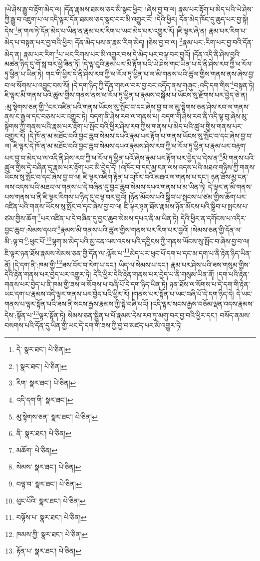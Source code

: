 །ཡེ་ཤེས་རྒྱུ་བ་རྟོག་མེད་ལ། །དོན་རྣམས་ཐམས་ཅད་མི་སྣང་ཕྱིར། །ཞེས་བྱ་བ་ལ། རྣམ་པར་རྟོག་པ་མེད་པའི་ཡེ་ཤེས་ཀྱི་རྒྱུ་བ་འཇུག་པ་ལ་འདི་ལྟར་དོན་ཐམས་ཅད་སྣང་བར་མི་འགྱུར་རོ། །དེའི་ཕྱིར། དོན་མེད་ཁོང་དུ་ཆུད་པར་བྱ་སྟེ། དེས་\footnote{དེ་  སྣར་ཐང་།  པེ་ཅིན། }ན་གལ་ཏེ་དོན་མེད་པ་ཡིན་ན་རྣམ་པར་རིག་པ་ཡང་མེད་པར་འགྱུར་རོ། །ཇི་ལྟར་ཞེ་ན། རྣམ་པར་རིག་པ་མེད་པ་བསྟན་པར་བྱ་བའི་ཕྱིར། དོན་མེད་པས་ན་རྣམ་རིག་མེད། །ཅེས་བྱ་བ་ལ། \footnote{།    སྣར་ཐང་།  པེ་ཅིན། }རྣམ་པར་:རིག་པར་བྱ་བའི་དོན་མེད་ན། རྣམ་པར་རིག་\footnote{རིག་  སྣར་ཐང་།  པེ་ཅིན། }པ་ཡང་རིགས་པར་མི་འགྱུར་བས་དེ་མེད་པར་བལྟ་བར་བྱའོ། །དོན་འདི་ནི་ཤེས་བྱའི་མཚན་ཉིད་དུ་གོ་སླ་བར་ཕྱེ་ཟིན་ཏོ། །དེ་ལྟ་བུའི་རྣམ་པར་མི་རྟོག་པའི་ཡེ་ཤེས་གང་ཡིན་པ་དེ་ནི་ཤེས་རབ་ཀྱི་ཕ་རོལ་ཏུ་ཕྱིན་པ་ཡིན་ཏེ། གང་གི་ཕྱིར་དེ་ནི་ཤེས་རབ་ཀྱི་ཕ་རོལ་ཏུ་ཕྱིན་པ་ལ་མི་གནས་པའི་ཚུལ་གྱིས་གནས་ནས་ཞེས་བྱ་བ་ལ་སོགས་པ་འབྱུང་བས་སོ། །དེ་དག་ཉིད་ཀྱི་དོན་གསལ་བར་བྱ་བར་འདོད་ནས་གཞུང་:འདི་དག་གིས་\footnote{འདི་དག་གི་  སྣར་ཐང་། }བསྟན་ཏེ། ཇི་ལྟར་མི་གནས་པའི་ཚུལ་གྱིས་གནས་ནས་ཕ་རོལ་ཏུ་ཕྱིན་པ་རྣམས་བསྒོམ་པ་ཡོངས་སུ་རྫོགས་པར་བྱེད་ཅེ་ན། :མུ་སྟེགས་ཅན་གྱི་\footnote{མུ་སྟེགས་ཅན་  སྣར་ཐང་།  པེ་ཅིན། }ངར་འཛིན་པའི་གནས་ཡོངས་སུ་སྤོང་བ་དང་ཞེས་བྱ་བ་ལ་མུ་སྟེགས་ཅན་ཤེས་རབ་ལ་གནས་ནས་ང་རྒྱལ་དང་བཅས་པར་འགྱུར་ཏེ། བདག་ནི་ཤེས་རབ་ལ་གནས་པ། བདག་གི་ཤེས་རབ་ནི་འདི་ལྟ་བུ་ཞེས་མུ་སྟེགས་ཀྱི་གནས་པའི་རྣམ་པར་རྟོག་པ་སྤོང་བའི་ཕྱིར་ཤེས་རབ་ཀྱིས་གནས་པ་མེད་པའི་ཚུལ་གྱིས་གནས་པར་འགྱུར་རོ། །དེ་ཁོ་ན་མ་མཐོང་བའི་བྱང་ཆུབ་སེམས་དཔའི་རྣམ་པར་རྟོག་པ་གནས་ཡོངས་སུ་སྤོང་བ་དང་ཞེས་བྱ་བ་ལ། ཇི་ལྟར་དེ་ཁོ་ན་མ་མཐོང་བའི་བྱང་ཆུབ་སེམས་དཔའ་རྣམས་ཤེས་རབ་ཀྱི་ཕ་རོལ་ཏུ་ཕྱིན་པ་རྣམ་པར་བརྟག་པར་བྱ་བ་མེད་པ་ལ་འདི་ནི་ཤེས་རབ་ཀྱི་ཕ་རོལ་ཏུ་ཕྱིན་པའོ་ཞེས་རྣམ་པར་རྟོག་པར་བྱེད་པ་དེས་ན་\footnote{ནི་  སྣར་ཐང་།  པེ་ཅིན། }མི་གནས་པའི་ཚུལ་གྱིས་དེ་བཞིན་དུ་རྣམ་པར་རྟོག་པར་མི་བྱེད་དོ། །འཁོར་བ་དང་མྱ་ངན་ལས་འདས་པའི་མཐའ་གཉིས་ཀྱི་གནས་ཡོངས་སུ་སྤོང་བ་དང་ཞེས་བྱ་བ་ལ། ཇི་ལྟར་འཇིག་རྟེན་པ་འཁོར་བའི་མཐའ་ལ་གནས་པ་དང་། ཉན་ཐོས་མྱ་ངན་ལས་འདས་པའི་མཐའ་ལ་གནས་པ་དེ་བཞིན་དུ་བྱང་ཆུབ་སེམས་དཔའ་གནས་པ་མ་ཡིན་ཏེ། དེ་ལྟར་ན་མི་གནས་པས་གནས་པ་ནི་ཇི་ལྟར་རིགས་པ་ཉིད་དུ་བལྟ་བར་བྱའོ། །ཉོན་མོངས་པའི་སྒྲིབ་པ་སྤངས་པ་ཙམ་གྱིས་ཆོག་པར་འཛིན་པའི་གནས་ཡོངས་སུ་སྤོང་བ་དང་ཞེས་བྱ་བ་ལ། ཇི་ལྟར་ཉན་ཐོས་རྣམས་ཉོན་མོངས་པའི་སྒྲིབ་པ་སྤངས་པ་ཙམ་གྱིས་ཆོག་\footnote{མཆོག་  པེ་ཅིན། }པར་འཛིན་པ་དེ་བཞིན་དུ་བྱང་ཆུབ་སེམས་དཔའ་ནི་མ་ཡིན་ཏེ། དེའི་ཕྱིར་ན་དགོངས་པ་འདིར་བྱང་ཆུབ་:སེམས་དཔའ་\footnote{སེམས་  སྣར་ཐང་།  པེ་ཅིན། }རྣམས་མི་གནས་པའི་ཚུལ་གྱིས་གནས་པར་རིག་པར་བྱའོ། །སེམས་ཅན་གྱི་དོན་ལ་མི་:ལྟ་བ་\footnote{བལྟ་བ་  སྣར་ཐང་།  པེ་ཅིན། }:ཕུང་པོ་\footnote{ཕུང་པོའི་  སྣར་ཐང་།  པེ་ཅིན། }ལྷག་མ་མེད་པའི་མྱ་ངན་ལས་འདས་པའི་དབྱིངས་ཀྱི་གནས་ཡོངས་སུ་སྤོང་བ་ཞེས་བྱ་བ་ལ། ཇི་ལྟར་ཉན་ཐོས་རྣམས་སེམས་ཅན་གྱི་དོན་ལ་:ལྟོས་པ་\footnote{བལྟོས་པ་  སྣར་ཐང་།  པེ་ཅིན། }མེད་པར་ཕུང་པོ་དག་པ་དང་མ་དག་པ་ནི་རྟེན་ཉིད་ཡིན་ནོ། །དེ་དག་ནི་:ཁམ་གྱི་\footnote{ཁམས་ཀྱི་  སྣར་ཐང་།  པེ་ཅིན། }ཟས་བོར་བ་རེག་པ་དང་། ཡིད་ལ་སེམས་པ་དང་། རྣམ་པར་ཤེས་པའི་ཟས་གསུམ་གྱིས་དེའི་རྟེན་གནས་པར་བྱེད་པར་འགྱུར་ཏེ། དེའི་ཕྱིར་དེའི་རྟེན་གནས་པར་བྱེད་པ་ནི་གསུམ་ཡིན་ནོ། །དག་པའི་རྟེན་གནས་པར་བྱེད་པ་ནི་ཁམ་གྱི་ཟས་ལ་སོགས་པ་བཞི་པོ་དེ་དག་ཉིད་ཡིན་ཏེ། ཉན་ཐོས་ལ་སོགས་པ་དེ་དག་གི་རྟེན་ཡང་དག་པ་རྣམས་འདི་ལྟར་གནས་པར་བྱེད་པའི་ཕྱིར་རོ། །གནས་པར་སྟོན་པ་ཡང་བཞི་པོ་དེ་དག་ཉིད་དེ། དེ་ཡང་གནས་པ་ལྟར་སྟོན་པའི་ཟས་ནི་སངས་རྒྱས་རྣམས་ཀྱི་སྟེ་བཞི་པའོ། །འདི་ལྟར་སངས་རྒྱས་བཅོམ་ལྡན་འདས་རྣམས་དེས་:སྟོན་པ་\footnote{རྟོན་པ་  སྣར་ཐང་།  པེ་ཅིན། }ལྟར་སྟོན་ཏེ། སེམས་ཅན་སྦྱིན་པ་པོ་རྣམས་དེས་རབ་ཏུ་མགུ་བར་བྱ་བའི་ཕྱིར་དང་། བསོད་ནམས་བསགས་པའི་དོན་དུ་ཡིན་གྱི་ཡང་དེ་དག་གི་ཟས་ཀྱི་བྱ་བ་མཛད་པར་མི་འགྱུར་ཏེ། 